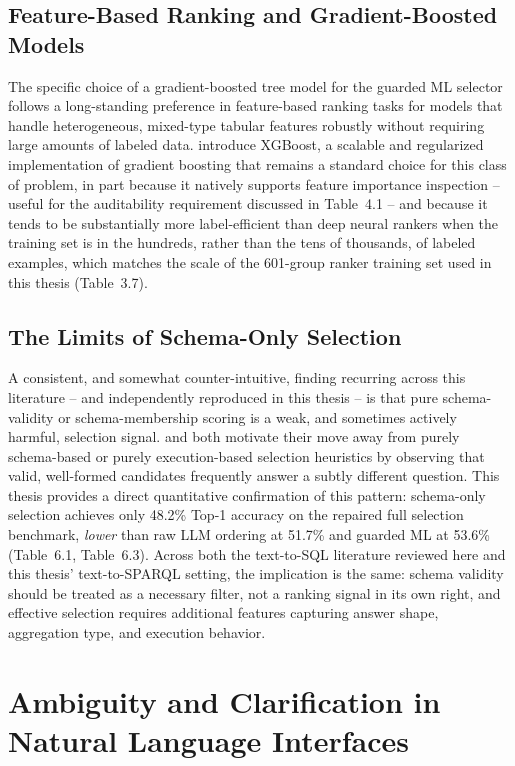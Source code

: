 \documentclass[
  12pt,
  english,
  oneside]{report}
\begin{document}
\subsection{Feature-Based Ranking and Gradient-Boosted Models}

The specific choice of a gradient-boosted tree model for the guarded ML
selector follows a long-standing preference in feature-based ranking tasks
for models that handle heterogeneous, mixed-type tabular features robustly
without requiring large amounts of labeled data. \citet{chen2016xgboost}
introduce XGBoost, a scalable and regularized implementation of gradient
boosting that remains a standard choice for this class of problem, in part
because it natively supports feature importance inspection -- useful for
the auditability requirement discussed in Table~4.1 -- and because it
tends to be substantially more label-efficient than deep neural rankers
when the training set is in the hundreds, rather than the tens of
thousands, of labeled examples, which matches the scale of the 601-group
ranker training set used in this thesis (Table~3.7).

\subsection{The Limits of Schema-Only Selection}

A consistent, and somewhat counter-intuitive, finding recurring across this
literature -- and independently reproduced in this thesis -- is that pure
schema-validity or schema-membership scoring is a weak, and sometimes
actively harmful, selection signal. \citet{pourreza2024chasesql} and
\citet{li2025xiyansql} both motivate their move away from purely
schema-based or purely execution-based selection heuristics by observing
that valid, well-formed candidates frequently answer a subtly different
question. This thesis provides a direct quantitative confirmation of this
pattern: schema-only selection achieves only 48.2\% Top-1 accuracy on the
repaired full selection benchmark, \emph{lower} than raw LLM ordering at
51.7\% and guarded ML at 53.6\% (Table~6.1, Table~6.3). Across both the text-to-SQL literature reviewed here and this
thesis' text-to-SPARQL setting, the implication is the same: schema
validity should be treated as a necessary filter, not a ranking signal in
its own right, and effective selection requires additional features
capturing answer shape, aggregation type, and execution behavior.

\section{Ambiguity and Clarification in Natural Language Interfaces}
\label{sec:ambiguity-detailed}
\end{document}
